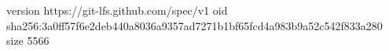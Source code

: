 version https://git-lfs.github.com/spec/v1
oid sha256:3a0ff57f6e2deb440a8036a9357ad7271b1bf65fcd4a983b9a52c542f833a280
size 5566

